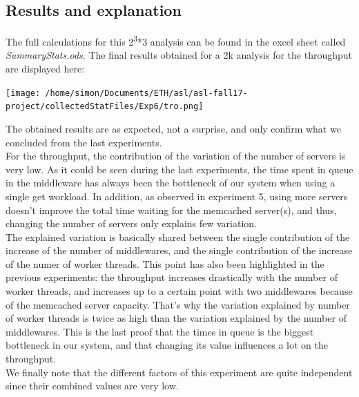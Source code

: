 \documentclass[11pt,a4paper]{article}
\begin{document}
\subsection{Results and explanation}
The full calculations for this 2\textsuperscript{3}*3 analysis can be found in the excel sheet called \textit{SummaryStats.ods}. The final results obtained for a 2k analysis for the throughput are displayed here:
\begin{center} 
\texttt{[image: /home/simon/Documents/ETH/asl/asl-fall17-project/collectedStatFiles/Exp6/tro.png]}
\end{center}
The obtained results are as expected, not a surprise, and only confirm what we concluded from the last experiments.
\\
For the throughput, the contribution of the variation of the number of servers is very low. As it could be seen during the last experiments, the time spent in queue in the middleware has always been the bottleneck of our system when using a single get workload. In addition, as observed in experiment 5, using more servers doesn't improve the total time waiting for the memcached server(s), and thus, changing the number of servers only explains few variation. 
\\
The explained variation is basically shared between the single contribution of the increase of the number of middlewares, and the single contribution of the increase of the numer of worker threads. This point has also been highlighted in the previous experiments: the throughput increases drastically with the number of worker threads, and increases up to a certain point with two middlewares because of the memcached server capacity. That's why the variation explained by number of worker threads is twice as high than the variation explained by the number of middlewares. This is the last proof that the times in queue is the biggest bottleneck in our system, and that changing its value influences a lot on the throughput. 
\\We finally note that the different factors of this experiment are quite independent since their combined values are very low. 
\newpage
\end{document}
